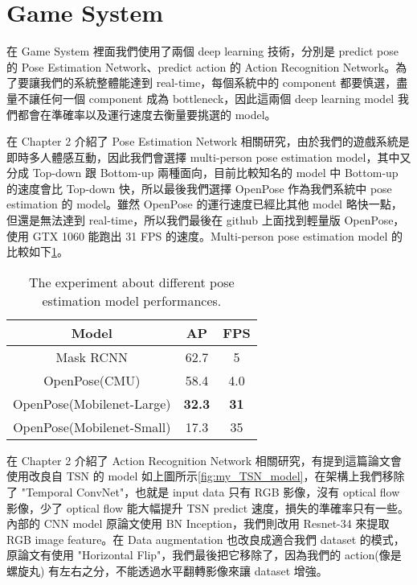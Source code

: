 \section{Game System}

在 Game System 裡面我們使用了兩個 deep learning 技術，分別是 predict pose 的 Pose Estimation Network、predict action 的 Action Recognition Network。為了要讓我們的系統整體能達到 real-time，每個系統中的 component 都要慎選，盡量不讓任何一個 component 成為 bottleneck，因此這兩個 deep learning model 我們都會在準確率以及運行速度去衡量要挑選的 model。

在 Chapter 2 介紹了 Pose Estimation Network 相關研究，由於我們的遊戲系統是即時多人體感互動，因此我們會選擇 multi-person pose estimation model，其中又分成 Top-down 跟 Bottom-up 兩種面向，目前比較知名的 model 中 Bottom-up 的速度會比 Top-down 快，所以最後我們選擇 OpenPose 作為我們系統中 pose estimation 的 model。雖然 OpenPose 的運行速度已經比其他 model 略快一點，但還是無法達到 real-time，所以我們最後在 github 上面找到輕量版 OpenPose，使用 GTX 1060 能跑出 31 FPS 的速度。Multi-person pose estimation model 的比較如下\ref{tab:pose_estimation_model}。

\begin{table}[htbp]
	\caption{The experiment about different pose estimation model performances.}
	\label{tab:pose_estimation_model}
	\begin{center}
		\begin{tabular}{c|c|c}
			\hline \hline
			Model & AP & FPS\\
			\hline
			Mask RCNN & 62.7 & 5 \\
			OpenPose(CMU) & 58.4 & 4.0 \\
			OpenPose(Mobilenet-Large) & \textbf{32.3} & \textbf{31}\\
			OpenPose(Mobilenet-Small) & 17.3 & 35 \\
			\hline \hline						
		\end{tabular}
	\end{center}
\end{table}


在 Chapter 2 介紹了 Action Recognition Network 相關研究，有提到這篇論文會使用改良自 TSN 的 model 如上圖所示\ref{fig:my_TSN_model}，在架構上我們移除了 "Temporal ConvNet"，也就是 input data 只有 RGB 影像，沒有 optical flow 影像，少了 optical flow 能大幅提升 TSN predict 速度，損失的準確率只有一些。內部的 CNN model 原論文使用 BN Inception，我們則改用 Resnet-34 來提取 RGB image feature。在 Data augmentation 也改良成適合我們 dataset 的模式，原論文有使用 "Horizontal Flip"，我們最後把它移除了，因為我們的 action(像是螺旋丸) 有左右之分，不能透過水平翻轉影像來讓 dataset 增強。


